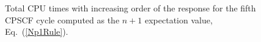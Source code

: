 \documentclass[prl,aps,preprint,showpacs,superbib]{revtex4}
\begin{document}
{\begin{figure}[h]
  \caption{Total CPU times with increasing order of the response for 
           the fifth CPSCF cycle computed as the $n+1$ expectation value, Eq.~(\ref{Np1Rule}).}\label{TimeWithOrder}
\end{figure}

}
\end{document}
